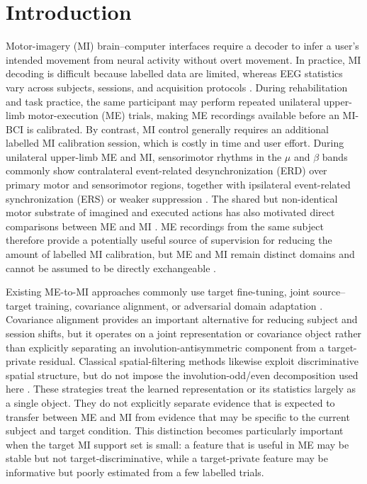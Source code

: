 \documentclass[preprint,12pt]{elsarticle}
\begin{document}
\section{Introduction}
Motor-imagery (MI) brain--computer interfaces require a decoder to infer a user's intended movement from neural activity without overt movement. In practice, MI decoding is difficult because labelled data are limited, whereas EEG statistics vary across subjects, sessions, and acquisition protocols \cite{lotte2018review,schirrmeister2017deep,lawhern2018eegnet,wolpaw2002bci,nicolasalonso2012review}. During rehabilitation and task practice, the same participant may perform repeated unilateral upper-limb motor-execution (ME) trials, making ME recordings available before an MI-BCI is calibrated. By contrast, MI control generally requires an additional labelled MI calibration session, which is costly in time and user effort. During unilateral upper-limb ME and MI, sensorimotor rhythms in the $\mu$ and $\beta$ bands commonly show contralateral event-related desynchronization (ERD) over primary motor and sensorimotor regions, together with ipsilateral event-related synchronization (ERS) or weaker suppression \cite{pfurtscheller1999,pfurtscheller2001,leocani1997erd}. The shared but non-identical motor substrate of imagined and executed actions has also motivated direct comparisons between ME and MI \cite{decety1996substrate,jeannerod1995imagery,miller2010cortical}. ME recordings from the same subject therefore provide a potentially useful source of supervision for reducing the amount of labelled MI calibration, but ME and MI remain distinct domains and cannot be assumed to be directly exchangeable \cite{schalk2004bci}.

Existing ME-to-MI approaches commonly use target fine-tuning, joint source--target training, covariance alignment, or adversarial domain adaptation \cite{he2020euclidean,long2015dan,sun2016coral,ganin2016dann,long2018cdan,pan2010transfer,bendavid2010domain}. Covariance alignment provides an important alternative for reducing subject and session shifts, but it operates on a joint representation or covariance object rather than explicitly separating an involution-antisymmetric component from a target-private residual. Classical spatial-filtering methods likewise exploit discriminative spatial structure, but do not impose the involution-odd/even decomposition used here \cite{blankertz2008spatial,ang2012filterbank}. These strategies treat the learned representation or its statistics largely as a single object. They do not explicitly separate evidence that is expected to transfer between ME and MI from evidence that may be specific to the current subject and target condition. This distinction becomes particularly important when the target MI support set is small: a feature that is useful in ME may be stable but not target-discriminative, while a target-private feature may be informative but poorly estimated from a few labelled trials.
\end{document}
